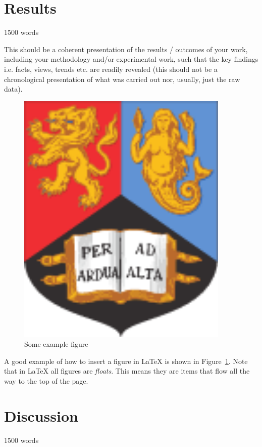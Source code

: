 \documentclass[12pt, a4paper]{article}
\newcommand{\figref}[1]{Figure~\ref{#1}}
\begin{document}
\section{Results}
1500 words

This should be a coherent presentation of the results / outcomes of your work, including your methodology and/or experimental work, such that the key findings i.e. facts, views, trends etc. are readily revealed (this should not be a chronological presentation of what was carried out nor, usually, just the raw data).

\begin{figure}
\begin{center}
\includegraphics[width=4in]{figures/bham_crest.pdf}
\caption{Some example figure}
\label{examplefig}
\end{center}
\end{figure}

A good example of how to insert a figure in \LaTeX{} is shown in \figref{examplefig}. Note that in \LaTeX{} all figures are \emph{floats}. This means they are items that flow all the way to the top of the page.








\section{Discussion}
1500 words
\end{document}
